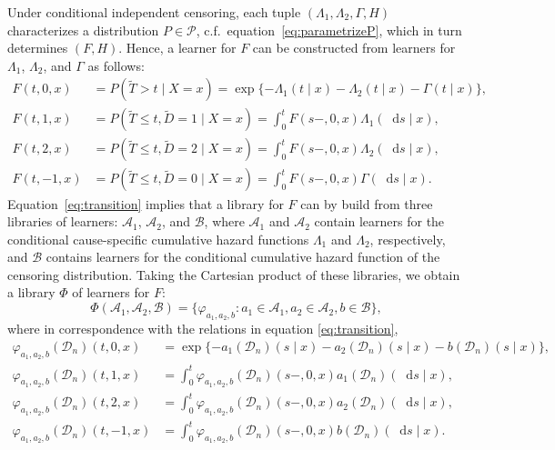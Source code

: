 \documentclass[a4paper,danish]{article}
\renewcommand{\phi}{\varphi}
\newcommand*\diff{\mathop{}\!\mathrm{d}}
\newcommand{\1}{\mathds{1}}
\newcommand{\data}{\ensuremath{\mathcal{D}}}
\theoremstyle{plain} %
\numberwithin{theorem}{section}
\theoremstyle{definition} %
\theoremstyle{remark}
\begin{document}
Under conditional independent censoring, each tuple
$(\Lambda_{1}, \Lambda_{2}, \Gamma, H)$ characterizes a distribution
\(P\in\mathcal P\), c.f.\ equation~\eqref{eq:parametrizeP}, which in
turn determines \( (F, H) \). Hence, a learner for \( F \) can be
constructed from learners for \( \Lambda_1 \), \( \Lambda_2 \), and
$\Gamma$ as follows:
\begin{equation}\label{eq:transition}
  \begin{split}
    F(t, 0, x)
    &
      = P(\tilde{T} > t \mid X= x)
      =
      \exp{{\{-\Lambda_{1}(t \mid x)-\Lambda_{2}(t \mid x) - \Gamma(t \mid x)\}
      }},
    \\
    F(t, 1, x)
    &
      = P(\tilde{T} \leq t, \tilde{D}=1 \mid X=x)
      = \int_0^t F(s-, 0, x)  \Lambda_{1}(\diff s \mid x),
    \\
    F(t, 2, x)
    &
      = P(\tilde{T} \leq t, \tilde{D}=2 \mid X=x)
      = \int_0^t  F(s-, 0, x)  \Lambda_{2}(\diff s \mid x),
    \\
    F(t, -1, x)
    &
      = P(\tilde{T} \leq t, \tilde{D}=0 \mid X=x)
      = \int_0^t F(s-, 0, x)  \Gamma(\diff s \mid x).
  \end{split}
\end{equation}
Equation~\eqref{eq:transition} implies that a library for \( F \) can
by build from three libraries of learners: \(\mathcal{A}_1\),
\( \mathcal{A}_2 \), and \( \mathcal{B} \), where \(\mathcal{A}_1\)
and \( \mathcal{A}_2\) contain learners for the conditional
cause-specific cumulative hazard functions \(\Lambda_1\) and
\( \Lambda_2\), respectively, and \(\mathcal{B}\) contains learners
for the conditional cumulative hazard function of the censoring
distribution.  Taking the Cartesian product of these libraries, we
obtain a library $\Phi$ of learners for \( F \):
\begin{equation}
  \label{eq:jssl-lib-def}
  \Phi(\mathcal{A}_1, \mathcal{A}_2, \mathcal{B})
  = \{ \phi_{a_1,a_2, b} : a_1 \in \mathcal{A}_1, a_2 \in \mathcal{A}_2, b \in \mathcal{B}\},
\end{equation}
where in correspondence with the relations in equation
\eqref{eq:transition},
\begin{equation}
  \begin{split}\label{eq:anti-transition}
    \phi_{a_1,a_2, b}(\data_n)(t,0,x)
  &= \exp{\{-a_1(\data_n)(s \mid x)-a_2(\data_n)(s \mid x) - b(\data_n)(s \mid
    x)\} },
  \\
  \phi_{a_1,a_2, b}(\data_n)(t,1,x)
  &= \int_0^t
    \phi_{a_1,a_2, b}(\data_n)(s-,0,x)  a_1(\data_n)(\diff s \mid x),
  \\
  \phi_{a_1,a_2, b}(\data_n)(t,2,x)
  &= \int_0^t\phi_{a_1,a_2, b}(\data_n)(s-,0,x)  a_2(\data_n)(\diff s \mid x),
  \\
  \phi_{a_1,a_2, b}(\data_n)(t,-1,x)
  &= \int_0^t \phi_{a_1,a_2, b}(\data_n)(s-,0,x)  b(\data_n)(\diff s \mid x).
  \end{split}
\end{equation}
\end{document}

